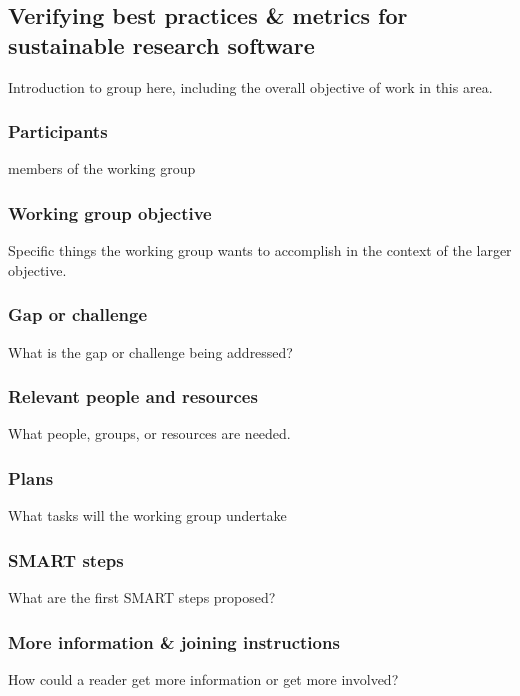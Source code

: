 \subsection{Verifying best practices \& metrics for sustainable research software}
\label{sec:best-practices-sustainable}


Introduction to group here, including the overall objective of work in this area.

\subsubsection{Participants}

members of the working group

\subsubsection{Working group objective}

Specific things the working group wants to accomplish in the context of the larger objective.

\subsubsection{Gap or challenge}

What is the gap or challenge being addressed?

\subsubsection{Relevant people and resources}

What people, groups, or resources are needed.

\subsubsection{Plans}

What tasks will the working group undertake

\subsubsection{SMART steps}

What are the first SMART steps proposed?

\subsubsection{More information \& joining instructions}

How could a reader get more information or get more involved?
